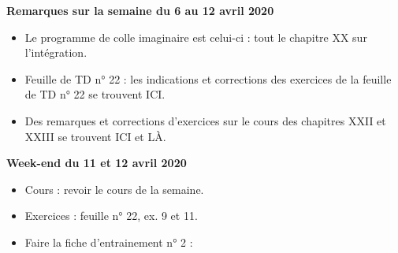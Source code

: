 \documentclass[12pt,a4paper]{article}
\begin{document}
% 
% 
% 
% 

 
\noindent\textbf{\bf Remarques sur la semaine du 6 au 12 avril 2020}
\begin{itemize}
\item Le programme de colle imaginaire est celui-ci : tout le chapitre XX sur l'intégration.
\item Feuille de TD n° 22 : les indications et corrections des exercices de la feuille de TD n° 22 se trouvent ICI.
\item Des remarques et corrections d'exercices sur le cours des chapitres XXII et XXIII se trouvent ICI et LÀ.\vspace{.4cm}
\end{itemize}

\noindent\textbf{Week-end du 11 et 12 avril 2020}
\begin{itemize}
\item Cours : revoir le cours de la semaine.
\item Exercices : feuille n° 22, ex. 9 et 11.
\item Faire la fiche d'entrainement n° 2 : 
\vspace{.4cm}
\end{itemize}
\end{document}
